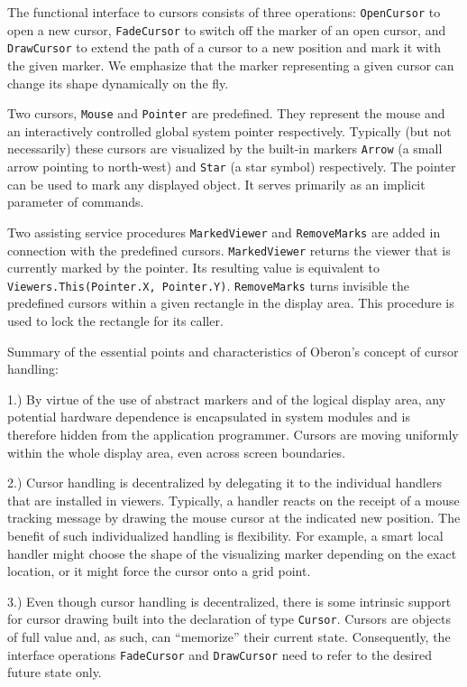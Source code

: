 The functional interface to cursors consists of three operations:
{\tt OpenCursor\/} to open a new cursor, {\tt FadeCursor\/} to switch off the marker
of an open cursor, and {\tt DrawCursor\/} to extend the path of a cursor to a
new position and mark it with the given marker. We emphasize that the
marker representing a given cursor can change its shape dynamically on
the fly.

Two cursors, {\tt Mouse\/} and {\tt Pointer\/} are predefined. They represent the
mouse and an interactively controlled global system pointer
respectively. Typically (but not necessarily) these cursors are
visualized by the built-in markers {\tt Arrow\/} (a small arrow pointing to
north-west) and {\tt Star\/} (a star symbol) respectively. The pointer can be
used to mark any displayed object. It serves primarily as an implicit
parameter of commands.

Two assisting service procedures {\tt MarkedViewer\/} and {\tt RemoveMarks\/} are
added in connection with the predefined cursors. {\tt MarkedViewer\/} returns
the viewer that is currently marked by the pointer. Its resulting
value is equivalent to {\tt Viewers.This(Pointer.X, Pointer.Y)\/}. {\tt RemoveMarks\/}
turns invisible the predefined cursors within a given rectangle in the
display area. This procedure is used to lock the rectangle for its
caller.

Summary of the essential points and characteristics of Oberon's concept of cursor handling:

1.) By virtue of the use of abstract markers and of the logical display area, any potential hardware dependence is encapsulated in system modules and is therefore hidden from the application programmer. Cursors are moving uniformly within the whole display area, even across screen boundaries.

2.) Cursor handling is decentralized by delegating it to the individual handlers that are installed in viewers. Typically, a handler reacts on the receipt of a mouse tracking message by drawing the mouse cursor at the indicated new position. The benefit of such individualized handling is flexibility. For example, a smart local handler might choose the shape of the visualizing marker depending on the exact location, or it might force the cursor onto a grid point.

3.) Even though cursor handling is decentralized, there is some intrinsic support for cursor drawing built into the declaration of type {\tt Cursor\/}. Cursors are objects of full value and, as such, can ``memorize'' their current state. Consequently, the interface operations {\tt FadeCursor\/} and {\tt DrawCursor\/} need to refer to the desired future state only.

